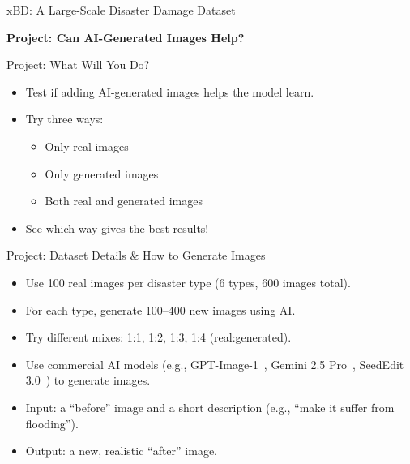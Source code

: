 \begin{refsection}
\begin{frame}{xBD: A Large-Scale Disaster Damage Dataset}
\begin{minipage}{0.55\linewidth}
      \end{minipage}
      \bottomleftrefs
    \end{frame}
  \end{refsection}
  
  \begin{frame}
    \centering
    \vspace{2.5cm}
    {\LARGE \textbf{Project: Can AI-Generated Images Help?}}
  \end{frame}
  
  \begin{refsection}
  \begin{frame}{Project: What Will You Do?}
    \begin{itemize}
      \item Test if adding AI-generated images helps the model learn.
      \item Try three ways:
        \begin{itemize}
          \item Only real images
          \item Only generated images
          \item Both real and generated images
        \end{itemize}
      \item See which way gives the best results!
    \end{itemize}
  \end{frame}
  \end{refsection}
  
  \begin{refsection}
  \begin{frame}{Project: Dataset Details \& How to Generate Images}
    \begin{itemize}
      \item Use 100 real images per disaster type (6 types, 600 images total).
      \item For each type, generate 100–400 new images using AI.
      \item Try different mixes: 1:1, 1:2, 1:3, 1:4 (real:generated).
      \item Use commercial AI models (e.g., GPT-Image-1~\parencite{gptimage1}, Gemini 2.5 Pro~\parencite{geminiteamgoogleGemini25Pushing}, SeedEdit 3.0~\parencite{wang2025seedit}) to generate images.
      \item Input: a “before” image and a short description (e.g., “make it suffer from flooding”).
      \item Output: a new, realistic “after” image.
    \end{itemize}
    \bottomleftrefs
  \end{frame}
  \end{refsection}
  
